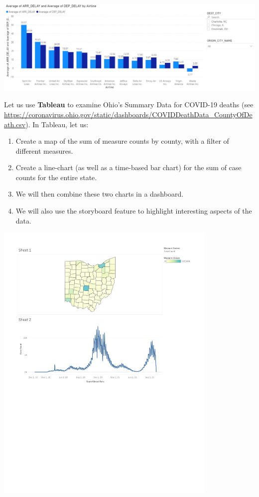 \documentclass[letterpaper,addpoints, 11pt]{exam}
\begin{document}
\begin{questions}
{\centering \includegraphics[width=\textwidth,frame]{figures/powerbi}}

\vspace{0.25in}

\question[0] Let us use \textbf{Tableau} to examine Ohio's Summary Data for COVID-19 deaths (see \url{https://coronavirus.ohio.gov/static/dashboards/COVIDDeathData_CountyOfDeath.csv}). In Tableau, let us:
\begin{enumerate}[label=(\Alph*)]
	\item Create a map of the sum of measure counts by county, with a filter of different measures.
	\item Create a line-chart (as well as a time-based bar chart) for the sum of case counts for the entire state.
	\item We will then combine these two charts in a dashboard.
	\item We will also use the storyboard feature to highlight interesting aspects of the data.
\end{enumerate}

\begin{center}
	\includegraphics[width=0.8\textwidth,frame, clip, trim={0.5in 4.5in 0.5in 0.5in} ]{figures/tableau_example.pdf}
\end{center}


\end{questions}
\end{document}
